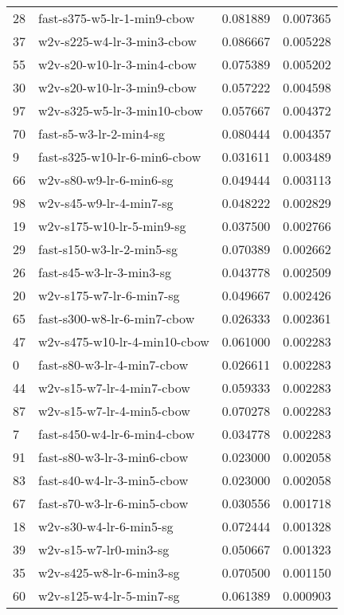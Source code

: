 {\begin{tabular}{llrr}
28 &   fast-s375-w5-lr-1-min9-cbow &  0.081889 &  0.007365 \\
37 &    w2v-s225-w4-lr-3-min3-cbow &  0.086667 &  0.005228 \\
55 &    w2v-s20-w10-lr-3-min4-cbow &  0.075389 &  0.005202 \\
30 &    w2v-s20-w10-lr-3-min9-cbow &  0.057222 &  0.004598 \\
97 &   w2v-s325-w5-lr-3-min10-cbow &  0.057667 &  0.004372 \\
70 &       fast-s5-w3-lr-2-min4-sg &  0.080444 &  0.004357 \\
9  &  fast-s325-w10-lr-6-min6-cbow &  0.031611 &  0.003489 \\
66 &       w2v-s80-w9-lr-6-min6-sg &  0.049444 &  0.003113 \\
98 &       w2v-s45-w9-lr-4-min7-sg &  0.048222 &  0.002829 \\
19 &     w2v-s175-w10-lr-5-min9-sg &  0.037500 &  0.002766 \\
29 &     fast-s150-w3-lr-2-min5-sg &  0.070389 &  0.002662 \\
26 &      fast-s45-w3-lr-3-min3-sg &  0.043778 &  0.002509 \\
20 &      w2v-s175-w7-lr-6-min7-sg &  0.049667 &  0.002426 \\
65 &   fast-s300-w8-lr-6-min7-cbow &  0.026333 &  0.002361 \\
47 &  w2v-s475-w10-lr-4-min10-cbow &  0.061000 &  0.002283 \\
0  &    fast-s80-w3-lr-4-min7-cbow &  0.026611 &  0.002283 \\
44 &     w2v-s15-w7-lr-4-min7-cbow &  0.059333 &  0.002283 \\
87 &     w2v-s15-w7-lr-4-min5-cbow &  0.070278 &  0.002283 \\
7  &   fast-s450-w4-lr-6-min4-cbow &  0.034778 &  0.002283 \\
91 &    fast-s80-w3-lr-3-min6-cbow &  0.023000 &  0.002058 \\
83 &    fast-s40-w4-lr-3-min5-cbow &  0.023000 &  0.002058 \\
67 &    fast-s70-w3-lr-6-min5-cbow &  0.030556 &  0.001718 \\
18 &       w2v-s30-w4-lr-6-min5-sg &  0.072444 &  0.001328 \\
39 &        w2v-s15-w7-lr0-min3-sg &  0.050667 &  0.001323 \\
35 &      w2v-s425-w8-lr-6-min3-sg &  0.070500 &  0.001150 \\
60 &      w2v-s125-w4-lr-5-min7-sg &  0.061389 &  0.000903 \\

\end{tabular}}
